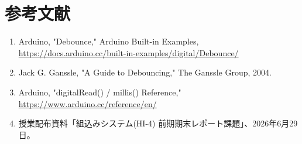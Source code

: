 \documentclass[12pt,a4paper]{ltjsarticle}
\begin{document}
\section{参考文献}\label{sec:references}
\begin{enumerate}
  \item Arduino, "Debounce," Arduino Built-in Examples,
        \url{https://docs.arduino.cc/built-in-examples/digital/Debounce/}
  \item Jack G. Ganssle, "A Guide to Debouncing," The Ganssle Group, 2004.
  \item Arduino, "digitalRead() / millis() Reference,"
        \url{https://www.arduino.cc/reference/en/}
  \item 授業配布資料「組込みシステム(HI-4) 前期期末レポート課題」、2026年6月29日。
\end{enumerate}
\end{document}
